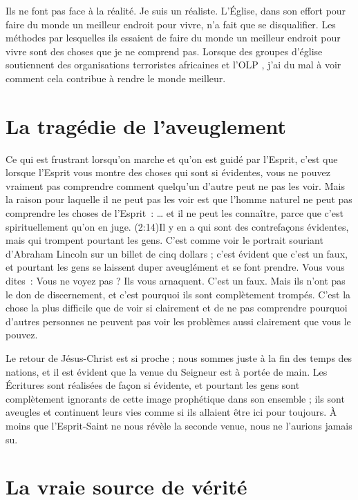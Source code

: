 Ils ne font pas face à la réalité. Je suis un réaliste.
 L'Église, dans son effort pour faire du monde un meilleur endroit
 pour vivre, n'a fait que se disqualifier.
 Les méthodes par lesquelles ils essaient de faire du monde un meilleur
 endroit pour vivre sont des choses que je ne comprend pas. 
 Lorsque des groupes d'église soutiennent des organisations terroristes
 africaines et l'OLP ,
 j'ai du mal à voir comment cela contribue à rendre le monde meilleur.

\section*{La tragédie de l'aveuglement}

Ce qui est frustrant lorsqu'on marche et qu'on est guidé par l'Esprit,
 c'est que lorsque l'Esprit vous montre des choses qui sont si évidentes,
 vous ne pouvez vraiment pas comprendre comment quelqu'un d'autre
 peut ne pas les voir. Mais la raison pour laquelle il ne peut pas les voir
 est que l'homme naturel ne peut pas comprendre les choses de l'Esprit~:
 \og \dots{} et il ne peut les connaître, parce que c'est spirituellement
 qu'on en juge. \fg{}
 (2:14)Il y en a qui sont des contrefaçons évidentes,
 mais qui trompent pourtant
 les gens. C'est comme voir le portrait souriant d'Abraham Lincoln
 sur un billet de cinq dollars ; c'est évident que c'est un faux,
 et pourtant les gens se laissent duper aveuglément et se font prendre.
 Vous vous dites~: \og Vous ne voyez pas ? Ils vous arnaquent.
 C'est un faux. \fg{}
 Mais ils n'ont pas le don de discernement, et c'est pourquoi ils sont
 complètement trompés.
 C'est la chose la plus difficile que de voir si clairement et de ne pas
 comprendre pourquoi d'autres personnes ne peuvent pas voir les problèmes
 aussi clairement que vous le pouvez.

Le retour de Jésus-Christ est si proche ; nous sommes juste à la fin
 des temps des nations, et il est évident que la venue du Seigneur
 est à portée de main. Les Écritures sont réalisées de façon si évidente,
 et pourtant les gens sont complètement ignorants de cette image prophétique
 dans son ensemble ; ils sont aveugles et continuent leurs vies
 comme si ils allaient être ici pour toujours.
 À moins que l'Esprit-Saint ne nous révèle la seconde venue,
 nous ne l'aurions jamais su.


\section*{La vraie source de vérité}

